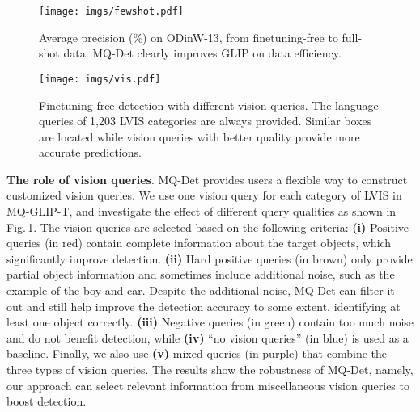 \begin{figure}[t]
\centering
\begin{minipage}[t]{0.36\textwidth}
\centering
\texttt{[image: imgs/fewshot.pdf]}
\caption{Average precision (\%) on ODinW-13, from finetuning-free to full-shot data. MQ-Det clearly improves GLIP on data efficiency.}
\label{fig:fewshot}
\end{minipage}
\hspace{1.5mm}
\begin{minipage}[t]{0.6\textwidth}
\centering
\texttt{[image: imgs/vis.pdf]}
\caption{Finetuning-free detection with different vision queries. The language queries of 1,203 LVIS categories are always provided. Similar boxes are located while vision queries with better quality provide more accurate predictions.}
\label{fig:vision_query}
\end{minipage}
\end{figure}



\textbf{The role of vision queries}.
MQ-Det provides users a flexible way to construct customized vision queries.
We use one vision query for each category of LVIS in MQ-GLIP-T, and investigate the effect of different query qualities as shown in Fig.\,\ref{fig:vision_query}. The vision queries are selected based on the following criteria: \textbf{(i)} Positive queries (in red) contain complete information about the target objects, which significantly improve detection. \textbf{(ii)} Hard positive queries (in brown) only provide partial object information and sometimes include additional noise, such as the example of the boy and car. Despite the additional noise, MQ-Det can filter it out and still help improve the detection accuracy to some extent, identifying at least one object correctly. \textbf{(iii)} Negative queries (in green) contain too much noise and do not benefit detection, while \textbf{(iv)} ``no vision queries'' (in blue) is used as a baseline. Finally, we also use \textbf{(v)} mixed queries (in purple) that combine the three types of vision queries. The results show the robustness of MQ-Det, namely, our approach can select relevant information from miscellaneous vision queries to boost detection.




